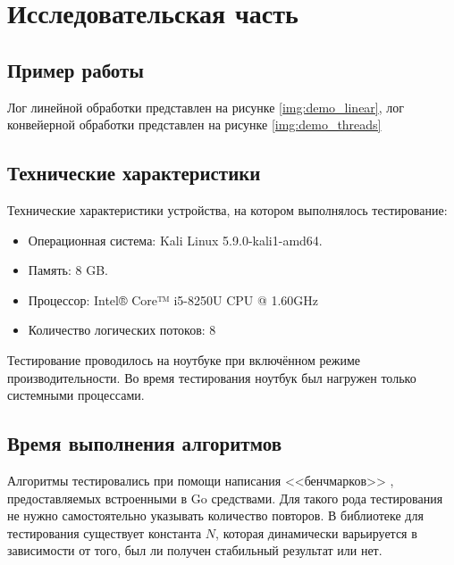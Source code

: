 \chapter{Исследовательская часть}

\section{Пример работы}

Лог линейной обработки представлен на рисунке \ref{img:demo_linear}, лог конвейерной обработки представлен на рисунке \ref{img:demo_threads}



\newpage


\section{Технические характеристики}

Технические характеристики устройства, на котором выполнялось тестирование:

\begin{itemize}
	\item Операционная система: Kali \cite{kali} Linux \cite{linux} 5.9.0-kali1-amd64.
	\item Память: 8 GB.
	\item Процессор: Intel® Core™ i5-8250U \cite{intel} CPU @ 1.60GHz
	\item Количество логических потоков: 8
\end{itemize}

Тестирование проводилось на ноутбуке при включённом режиме производительности. Во время тестирования ноутбук был нагружен только системными процессами.


\section{Время выполнения алгоритмов}

Алгоритмы тестировались при помощи написания <<бенчмарков>> \cite{gotest}, предоставляемых встроенными в Go средствами. Для такого рода тестирования не нужно самостоятельно указывать количество повторов. В библиотеке для тестирования существует константа $N$, которая динамически варьируется в зависимости от того, был ли получен стабильный результат или нет.

